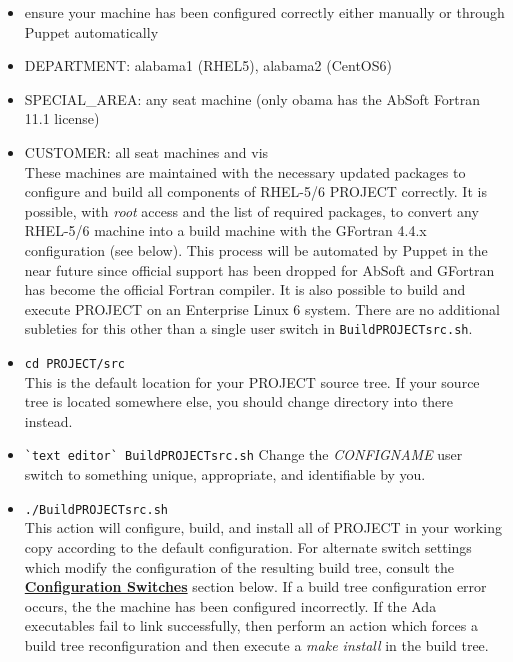 \documentclass[12pt,letterpaper]{article}
\begin{document}
\begin{itemize}
\item ensure your machine has been configured correctly either manually or through Puppet automatically
\item DEPARTMENT: alabama1 (RHEL5), alabama2 (CentOS6)
\item SPECIAL_AREA: any seat machine (only obama has the AbSoft Fortran 11.1 license)
\item CUSTOMER: all seat machines and vis\\
These machines are maintained with the necessary updated packages to configure and build all components of RHEL-5/6 PROJECT correctly.  It is possible, with \emph{root} access and the list of required packages, to convert any RHEL-5/6 machine into a build machine with the GFortran 4.4.x configuration (see below).  This process will be automated by Puppet in the near future since official support has been dropped for AbSoft and GFortran has become the official Fortran compiler.  It is also possible to build and execute PROJECT on an Enterprise Linux 6 system.  There are no additional subleties for this other than a single user switch in \verb|BuildPROJECTsrc.sh|.
\item \verb|cd PROJECT/src|\\
This is the default location for your PROJECT source tree.  If your source tree is located somewhere else, you should change directory into there instead.
\item \verb|`text editor` BuildPROJECTsrc.sh|
Change the \emph{CONFIGNAME} user switch to something unique, appropriate, and identifiable by you.
\item \verb|./BuildPROJECTsrc.sh|\\
This action will configure, build, and install all of PROJECT in your working copy according to the default configuration.  For alternate switch settings which modify the configuration of the resulting build tree, consult the \hyperlink{configswitches}{\textbf{Configuration Switches}} section below.  If a build tree configuration error occurs, the the machine has been configured incorrectly.  If the Ada executables fail to link successfully, then perform an action which forces a build tree reconfiguration and then execute a \emph{make install} in the build tree.
\end{itemize}
\end{document}
